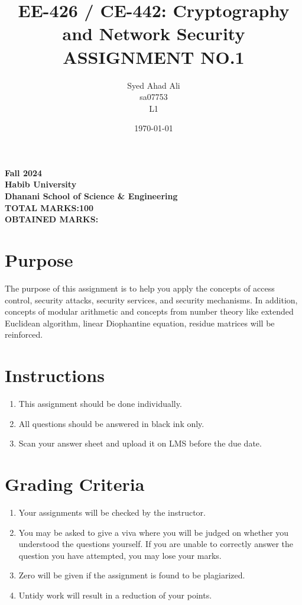 \documentclass[a4paper]{exam}
\title{EE-426 / CE-442:  Cryptography and Network Security\\
ASSIGNMENT NO.1}
\author{Syed Ahad Ali\\
sa07753\\
L1}
\date{\today}
\begin{document}
    \maketitle

    \begin{center}
        \textbf{Fall 2024}\\
        \textbf{Habib University}\\
        \textbf{Dhanani School of Science \& Engineering}\\
        \textbf{TOTAL MARKS:100}\\
        \textbf{OBTAINED MARKS:}
    \end{center}


    \section*{Purpose}
    The purpose of this assignment is to help you apply the concepts of access control, security attacks, security services, and security mechanisms. In addition, concepts of modular arithmetic and concepts from number theory like extended Euclidean algorithm, linear Diophantine equation, residue matrices will be reinforced.

    \section*{Instructions}
    \begin{enumerate}
        \item This assignment should be done individually.
        \item All questions should be answered in black ink only.
        \item Scan your answer sheet and upload it on LMS before the due date.
    \end{enumerate}

    \section*{Grading Criteria}
    \begin{enumerate}
        \item Your assignments will be checked by the instructor.
        \item You may be asked to give a viva where you will be judged on whether you understood the questions yourself. If you are unable to correctly answer the question you have attempted, you may lose your marks.
        \item Zero will be given if the assignment is found to be plagiarized.
        \item Untidy work will result in a reduction of your points.
    \end{enumerate}
\end{document}
